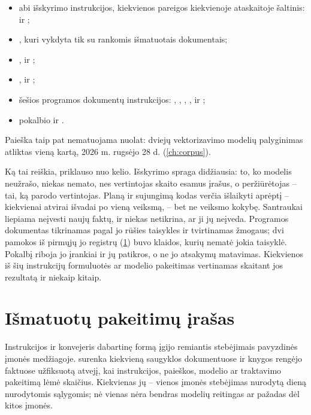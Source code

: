 \begin{itemize}
  \item abi išskyrimo instrukcijos, kiekvienos pareigos kiekvienoje ataskaitoje šaltinis:
     ir ;
  \item {}, kuri vykdyta tik su rankomis išmatuotais
    dokumentais;
  \item {},  ir
    ;
  \item {},  ir ;
  \item šešios programos dokumentų instrukcijos: ,
    , , ,
     ir ;
  \item pokalbio  ir .
\end{itemize}

Paieška taip pat nematuojama nuolat: dviejų vektorizavimo modelių palyginimas atliktas vieną
kartą, 2026 m. rugsėjo 28 d. (\cref{ch:corpus}).

Ką tai reiškia, priklauso nuo kelio. Išskyrimo spraga didžiausia: to, ko modelis neužrašo,
niekas nemato, nes vertintojas skaito esamus įrašus, o peržiūrėtojas -- tai, ką parodo
vertintojas. Planą ir sujungimą kodas verčia išlaikyti aprėptį -- kiekvienai atvirai
išvadai po vieną veiksmą, -- bet ne veiksmo kokybę. Santraukai liepiama neįvesti naujų
faktų, ir niekas netikrina, ar ji jų neįveda. Programos dokumentas tikrinamas pagal jo rūšies
taisykles ir tvirtinamas žmogaus; dvi pamokos iš pirmųjų jo registrų
(\cref{sec:control:record}) buvo klaidos, kurių nematė jokia taisyklė. Pokalbį riboja jo
įrankiai ir jų patikros, o ne jo atsakymų matavimas. Kiekvienos iš šių instrukcijų
formuluotės ar modelio pakeitimas vertinamas skaitant jos rezultatą ir niekaip kitaip.


\section{Išmatuotų pakeitimų įrašas}\label{sec:control:record}

Instrukcijos ir konvejeris dabartinę formą įgijo remiantis stebėjimais pavyzdinės įmonės
medžiagoje.  surenka kiekvieną saugyklos dokumentuose ir knygos
rengėjo faktuose užfiksuotą atvejį, kai instrukcijos, paieškos, modelio ar traktavimo
pakeitimą lėmė skaičius. Kiekvienas jų -- vienos įmonės stebėjimas nurodytą dieną nurodytomis
sąlygomis; nė vienas nėra bendras modelių reitingas ar pažadas dėl kitos įmonės.


